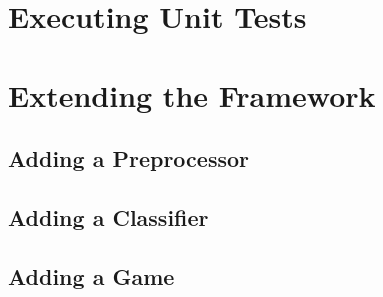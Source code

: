 \documentclass[master,english]{hgbthesis}
\begin{document}
\section{Executing Unit Tests}
\section{Extending the Framework}
\subsection{Adding a Preprocessor}
\subsection{Adding a Classifier}
\subsection{Adding a Game}

\MakeBibliography                        				%



\end{document}
